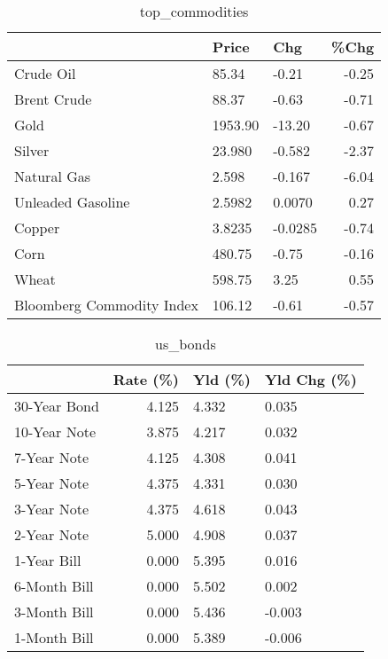 \documentclass{article}%
\begin{document}
\begin{table}[htbp]%
\caption{top\_commodities}%
\centering%
\begin{adjustbox}{width=1\textwidth}%
\begin{tabular}{lllr}
\toprule
                          &   Price &     Chg &  \%Chg \\
\midrule
               Crude Oil  &   85.34 &   -0.21 & -0.25 \\
             Brent Crude  &   88.37 &   -0.63 & -0.71 \\
                    Gold  & 1953.90 &  -13.20 & -0.67 \\
                  Silver  &  23.980 &  -0.582 & -2.37 \\
             Natural Gas  &   2.598 &  -0.167 & -6.04 \\
       Unleaded Gasoline  &  2.5982 &  0.0070 &  0.27 \\
                  Copper  &  3.8235 & -0.0285 & -0.74 \\
                    Corn  &  480.75 &   -0.75 & -0.16 \\
                   Wheat  &  598.75 &    3.25 &  0.55 \\
Bloomberg Commodity Index &  106.12 &   -0.61 & -0.57 \\
\bottomrule
\end{tabular}
%
\end{adjustbox}%
\end{table}

%


\begin{table}[htbp]%
\caption{us\_bonds}%
\centering%
\begin{adjustbox}{width=1\textwidth}%
\begin{tabular}{lrll}
\toprule
             &  Rate (\%) & Yld (\%) & Yld Chg (\%) \\
\midrule
30-Year Bond &     4.125 &   4.332 &       0.035 \\
10-Year Note &     3.875 &   4.217 &       0.032 \\
 7-Year Note &     4.125 &   4.308 &       0.041 \\
 5-Year Note &     4.375 &   4.331 &       0.030 \\
 3-Year Note &     4.375 &   4.618 &       0.043 \\
 2-Year Note &     5.000 &   4.908 &       0.037 \\
 1-Year Bill &     0.000 &   5.395 &       0.016 \\
6-Month Bill &     0.000 &   5.502 &       0.002 \\
3-Month Bill &     0.000 &   5.436 &      -0.003 \\
1-Month Bill &     0.000 &   5.389 &      -0.006 \\
\bottomrule
\end{tabular}
%
\end{adjustbox}%
\end{table}
\end{document}
